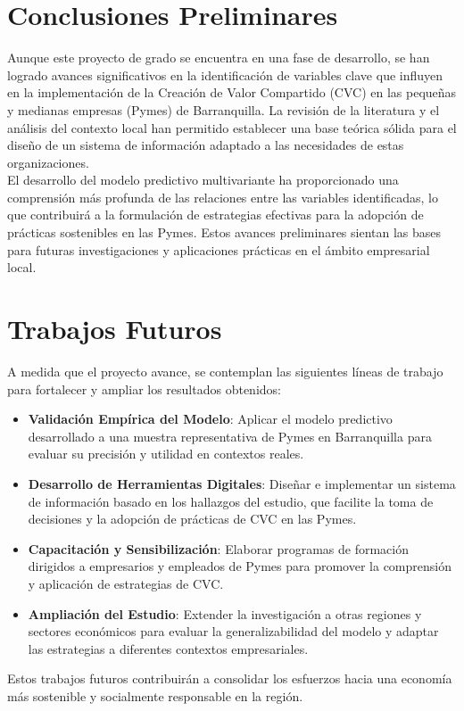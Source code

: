 \section{Conclusiones Preliminares}

Aunque este proyecto de grado se encuentra en una fase de desarrollo, se han logrado avances significativos en la identificación de variables clave que influyen en la implementación de la Creación de Valor Compartido (CVC) en las pequeñas y medianas empresas (Pymes) de Barranquilla. La revisión de la literatura y el análisis del contexto local han permitido establecer una base teórica sólida para el diseño de un sistema de información adaptado a las necesidades de estas organizaciones.\\

El desarrollo del modelo predictivo multivariante ha proporcionado una comprensión más profunda de las relaciones entre las variables identificadas, lo que contribuirá a la formulación de estrategias efectivas para la adopción de prácticas sostenibles en las Pymes. Estos avances preliminares sientan las bases para futuras investigaciones y aplicaciones prácticas en el ámbito empresarial local.

\section{Trabajos Futuros}

A medida que el proyecto avance, se contemplan las siguientes líneas de trabajo para fortalecer y ampliar los resultados obtenidos:

\begin{itemize}
    \item \textbf{Validación Empírica del Modelo}: Aplicar el modelo predictivo desarrollado a una muestra representativa de Pymes en Barranquilla para evaluar su precisión y utilidad en contextos reales.
    \item \textbf{Desarrollo de Herramientas Digitales}: Diseñar e implementar un sistema de información basado en los hallazgos del estudio, que facilite la toma de decisiones y la adopción de prácticas de CVC en las Pymes.
    \item \textbf{Capacitación y Sensibilización}: Elaborar programas de formación dirigidos a empresarios y empleados de Pymes para promover la comprensión y aplicación de estrategias de CVC.
    \item \textbf{Ampliación del Estudio}: Extender la investigación a otras regiones y sectores económicos para evaluar la generalizabilidad del modelo y adaptar las estrategias a diferentes contextos empresariales.
\end{itemize}

Estos trabajos futuros contribuirán a consolidar los esfuerzos hacia una economía más sostenible y socialmente responsable en la región.
